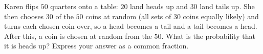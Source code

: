 Karen flips $50$ quarters onto a table: $20$ land heads up and $30$ land tails up. She then chooses $30$ of the $50$ coins at random (all sets of $30$ coins equally likely) and turns each chosen coin over, so a head becomes a tail and a tail becomes a head. After this, a coin is chosen at random from the $50$. What is the probability that it is heads up? Express your answer as a common fraction.
